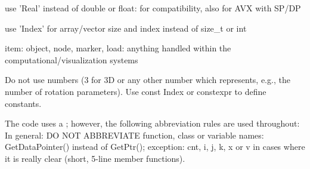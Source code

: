     \item use 'Real' instead of double or float: for compatibility, also for AVX with SP/DP
    \item use 'Index' for array/vector size and index instead of size\_t or int
    \item item: object, node, marker, load: anything handled within the computational/visualization systems
    \item Do not use numbers (3 for 3D or any other number which represents, e.g., the number of rotation parameters). Use const Index or constexpr to define constants.
\ei

%
The code uses a ; however, the following abbreviation rules are used throughout:
In general: DO NOT ABBREVIATE function, class or variable names: GetDataPointer() instead of GetPtr(); exception: cnt, i, j, k, x or v in cases where it is really clear (short, 5-line member functions).

